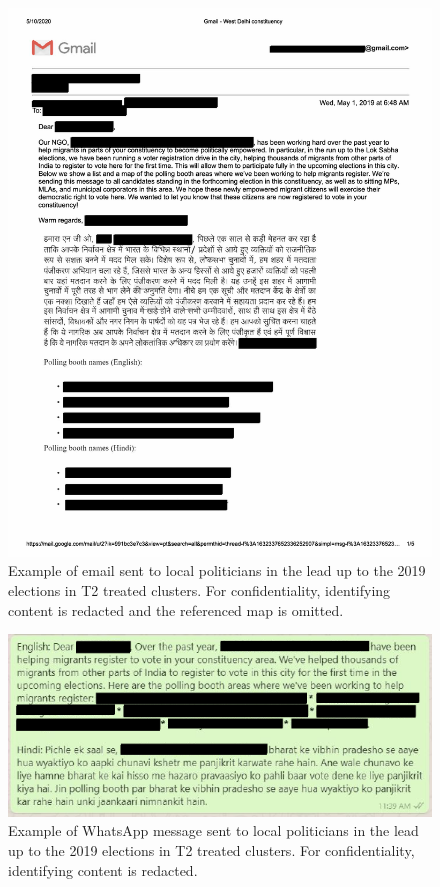 \documentclass[
  11.5pt,
]{article}
\begin{document}
\begin{figure}

{\centering \includegraphics[width=0.7\linewidth]{pic-t2-email} 

}

\caption{Example of email sent to local politicians in the lead up to the 2019 elections in T2 treated clusters. For confidentiality, identifying content is redacted and the referenced map is omitted.}\label{fig:unnamed-chunk-34}
\end{figure}

\begin{figure}

{\centering \includegraphics[width=0.7\linewidth]{pic-t2-whatsapp} 

}

\caption{Example of WhatsApp message sent to local politicians in the lead up to the 2019 elections in T2 treated clusters. For confidentiality, identifying content is redacted.}\label{fig:unnamed-chunk-35}
\end{figure}
\end{document}
